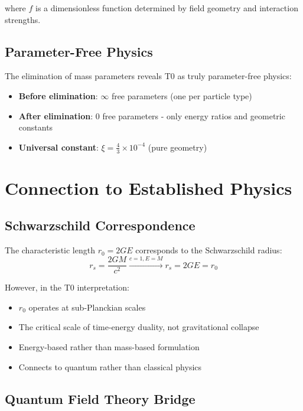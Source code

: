 \documentclass[12pt,a4paper]{report}
\newcommand{\rzero}{r_0}                  %
\begin{document}
	where $f$ is a dimensionless function determined by field geometry and interaction strengths.
	
	\subsection{Parameter-Free Physics}
	\label{subsec:parameter_free}
	
	The elimination of mass parameters reveals T0 as truly parameter-free physics:
	\begin{itemize}
		\item \textbf{Before elimination}: $\infty$ free parameters (one per particle type)
		\item \textbf{After elimination}: 0 free parameters - only energy ratios and geometric constants
		\item \textbf{Universal constant}: $\xi = \frac{4}{3} \times 10^{-4}$ (pure geometry)
	\end{itemize}
	
	\section{Connection to Established Physics}
	\label{sec:connection_established}
	
	\subsection{Schwarzschild Correspondence}
	\label{subsec:schwarzschild_correspondence}
	
	The characteristic length $\rzero = 2GE$ corresponds to the Schwarzschild radius:
	\begin{equation}
		r_s = \frac{2GM}{c^2} \xrightarrow{c=1, E=M} r_s = 2GE = \rzero
	\end{equation}
	
	However, in the T0 interpretation:
	\begin{itemize}
		\item $\rzero$ operates at sub-Planckian scales
		\item The critical scale of time-energy duality, not gravitational collapse
		\item Energy-based rather than mass-based formulation
		\item Connects to quantum rather than classical physics
	\end{itemize}
	
	\subsection{Quantum Field Theory Bridge}
	\label{subsec:qft_bridge}
	
\end{document}
